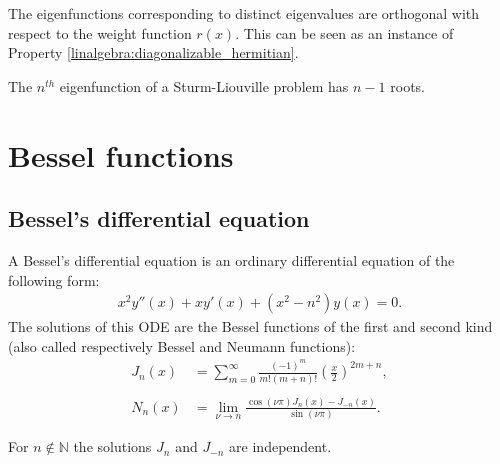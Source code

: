     \begin{property}
        The eigenfunctions corresponding to distinct eigenvalues are orthogonal with respect to the weight function $r(x)$. This can be seen as an instance of Property \ref{linalgebra:diagonalizable_hermitian}.
    \end{property}

    \begin{theorem}
        The $n^{th}$ eigenfunction of a Sturm-Liouville problem has $n-1$ roots.
    \end{theorem}

\section{Bessel functions}
\subsection{Bessel's differential equation}

    A Bessel's differential equation is an ordinary differential equation of the following form:
    \begin{gather}
        \label{diffeq:differential_equation}
        x^2y''(x) + xy'(x) + (x^2 - n^2)y(x) = 0.
    \end{gather}
    The solutions of this ODE are the Bessel functions of the first and second kind (also called respectively Bessel and Neumann functions):
    \begin{align}
        \label{diffeq:bessel_function}
        J_n(x) &= \sum_{m=0}^\infty\frac{(-1)^m}{m!(m + n)!}\left(\frac{x}{2}\right)^{2m+n},\\\nonumber\\
        \label{diffeq:neumann_function}
        N_n(x) &= \lim_{\nu\rightarrow n}\frac{\cos(\nu\pi)J_n(x) - J_{-n}(x)}{\sin(\nu\pi)}.
    \end{align}

    \begin{property}
        For $n\not\in\mathbb{N}$ the solutions $J_n$ and $J_{-n}$ are independent.
    \end{property}

